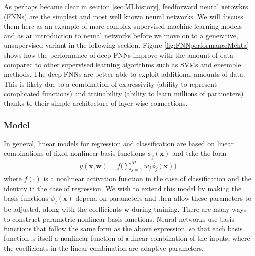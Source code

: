 \documentclass[twoside,english]{uiofysmaster}
\begin{document}
As perhaps became clear in section \ref{sec:MLhistory}, feedforward neural netowkrs (FNNs) are the simplest and most well known neural networks. We will discuss them here as an example of more complex supervised machine learning models and as an introduction to neural networks before we move on to a generative, unsupervised variant in the following section. Figure \ref{fig:FNNperformanceMehta} shows how the performance of deep FNNs improve with the amount of data compared to other supervised learning algorithms such as SVMs and ensemble methods. The deep FNNs are better able to exploit additional amounts of data. This is likely due to a combination of expressivity (ability to represent complicated functions) and trainability (ability to learn millions of parameters) thanks to their simple architecture of layer-wise connections.



\subsubsection{Model}

In general, linear models for regression and classification are based on linear combinations of fixed nonlinear basis functions $\phi_j (\bm{x})$ and take the form
\begin{align}
	y(\bm{x}, \bm{w}) = f \Big (\sum_{j=1}^M w_j \phi_j (\bm{x})   \Big) \label{eq:LinCombNonlinBasis}
\end{align}
where $f(\cdot)$ is a nonlinear activation function in the case of classification and the identity in the case of regression. We wish to extend this model by making the basis functions $\phi_j (\bm{x})$ depend on parameters and then allow these parameters to be adjusted, along with the coefficients $\bm{w}$ during training. There are many ways to construct parametric nonlinear basis functions. Neural networks use basis functions that follow the same form as the above expression, so that each basis function is itself a nonlinear function of a linear combination of the inputs, where the coefficients in the linear combination are adaptive parameters. 
\end{document}

